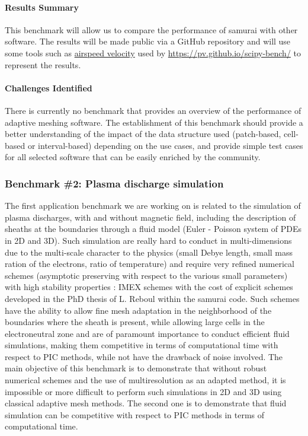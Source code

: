 \paragraph{Results Summary}
This benchmark will allow us to compare the performance of samurai with other software. The results will be made public via a GitHub repository and will use some tools such as \href{https://github.com/airspeed-velocity/asv}{airspeed velocity} used by \href{scipy}{https://pv.github.io/scipy-bench/} to represent the results.

\paragraph{Challenges Identified}
There is currently no benchmark that provides an overview of the performance of adaptive meshing software. The establishment of this benchmark should provide a better understanding of the impact of the data structure used (patch-based, cell-based or interval-based) depending on the use cases, and provide simple test cases for all selected software that can be easily enriched by the community.


\subsubsection{Benchmark \#2: Plasma discharge simulation}

The first application benchmark we are working on is related to the simulation of plasma discharges, with and without magnetic field, including the description of sheaths at the boundaries through a fluid model (Euler - Poisson system of PDEs in 2D and 3D). Such simulation are really hard to conduct in multi-dimensions due to the multi-scale character to the physics (small Debye length, small mass ration of the electrons, ratio of temperature) and require very refined numerical schemes (asymptotic preserving with respect to the various small parameters) with high stability properties : IMEX schemes with the cost of explicit schemes developed in the PhD thesis of L. Reboul within the samurai code. Such schemes have the ability to allow fine mesh adaptation in the neighborhood of the boundaries where the sheath is present, while allowing large cells in the electroneutral zone and are of paramount importance to conduct efficient fluid simulations, making them competitive in terms of computational time with respect to PIC methods, while not have the drawback of noise involved. The main objective of this benchmark is to demonstrate that without robust numerical schemes and the use of multiresolution as an adapted method, it is impossible or more difficult to perform such simulations in 2D and 3D using classical adaptive mesh methods. The second one is to demonstrate that fluid simulation can be competitive with respect to PIC methods in terms of computational time.

